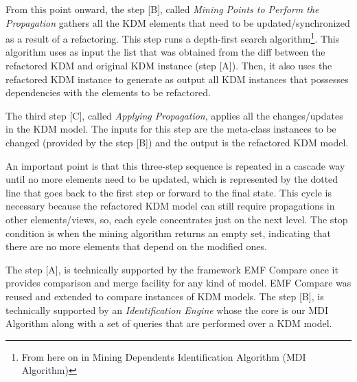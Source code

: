 From this point onward, the step [B], called \textit{Mining Points to Perform the Propagation} gathers all the KDM elements that need to be updated/synchronized as a result of a refactoring. %
This step runs a depth-first search algorithm\footnote{From here on in Mining Dependents Identification Algorithm (MDI Algorithm)}. This algorithm uses as input the list that was obtained from the diff between the refactored KDM and original KDM instance (step [A]).
Then, it also uses the refactored KDM instance to generate as output all KDM instances that possesses dependencies with the elements to be refactored. 

The third step [C], called \textit{Applying Propagation}, applies all the changes/updates in the KDM model. The inputs for this step are the meta-class instances to be changed (provided by the step [B]) and the output is the refactored KDM model.

An important point is that this three-step sequence is repeated in a cascade way until no more elements need to be updated, which is represented by the dotted line that goes back to the first step or forward to the final state. This cycle is necessary because the refactored KDM model can still require propagations in other elements/views, so, each cycle concentrates just on the next level. The stop condition is when the mining algorithm returns an empty set, indicating that there are no more elements that depend on the modified ones.

The step [A], is technically supported by the framework EMF Compare once it provides comparison and merge facility for any kind of model. EMF Compare was reused and extended to compare instances of KDM models. The step [B], is technically supported by an \textit{Identification Engine} whose the core is our MDI Algorithm along with a set of queries that are performed over a KDM model. %

